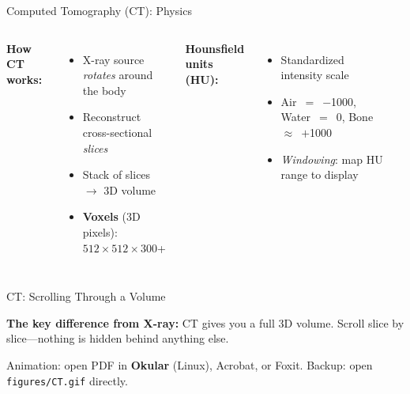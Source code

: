 \documentclass[aspectratio=169,10pt]{beamer}
\begin{document}
\begin{frame}{Computed Tomography (CT): Physics}
\begin{columns}[T]
\textbf{How CT works:}
\begin{itemize}
    \item X-ray source \emph{rotates} around the body
    \item Reconstruct cross-sectional \emph{slices}
    \item Stack of slices $\to$ 3D volume
    \item \textbf{Voxels} (3D pixels): $512{\times}512{\times}300$+
\end{itemize}

\vspace{0.2em}
\pause
\textbf{Hounsfield units (HU):}
\begin{itemize}
    \item Standardized intensity scale
    \item Air~$=$~$-$1000, Water~$=$~0, Bone~$\approx$~$+$1000
    \item \emph{Windowing}: map HU range to display
\end{itemize}

\begin{center}
\end{center}
\end{columns}
\end{frame}

\begin{frame}{CT: Scrolling Through a Volume}
\begin{center}
\end{center}
\vspace{-0.3em}
\textbf{The key difference from X-ray:} CT gives you a full 3D volume. Scroll slice by slice---nothing is hidden behind anything else.

\vspace{0.2em}
{\small Animation: open PDF in \textbf{Okular} (Linux), Acrobat, or Foxit. Backup: open \texttt{figures/CT.gif} directly.}
\end{frame}
\end{document}
